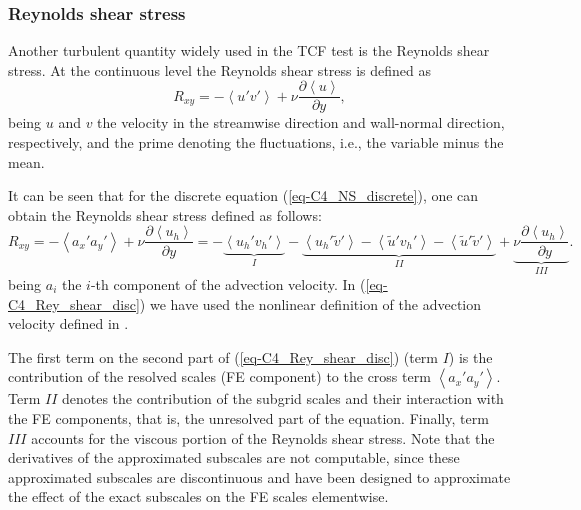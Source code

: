 \subsubsection{Reynolds shear stress}

Another turbulent quantity widely used in the TCF test is the Reynolds shear stress. At the continuous level the Reynolds shear stress is defined as
\begin{equation}
\label{eq-C4_Rey_shear_cont}
R_{xy}=-\left\langle u'v'\right\rangle+\nu\frac{\partial\left\langle u\right\rangle}{\partial y},
\end{equation}
being $u$ and $v$ the velocity in the streamwise direction and wall-normal direction, respectively,
and the prime denoting the fluctuations, i.e., the variable minus the mean.

It can be seen that for the discrete equation (\ref{eq-C4_NS_discrete}), one can obtain the Reynolds shear stress defined as follows:
\begin{equation}
\label{eq-C4_Rey_shear_disc}
R_{xy}=-\left\langle a_x'a_y'\right\rangle+\nu\frac{\partial\left\langle u_h\right\rangle}{\partial y}=-\underbrace{\left\langle u_h'v_h'\right\rangle}_I-\underbrace{\left\langle u_h'\tilde{v}'\right\rangle-\left\langle \tilde{u}'v_h'\right\rangle-\left\langle \tilde{u}'\tilde{v}'\right\rangle}_{II}+\underbrace{\nu\frac{\partial\left\langle u_h\right\rangle}{\partial y}}_{III}.
\end{equation}
being $a_i$ the $i$-th component of the advection velocity. In (\ref{eq-C4_Rey_shear_disc}) we have used the nonlinear definition of the advection velocity defined in .

The first term on the second part of  (\ref{eq-C4_Rey_shear_disc}) (term $I$) is the contribution of the resolved scales (FE component) to the cross term $\left\langle a_x'a_y'\right\rangle$. Term $II$ denotes the contribution of the subgrid scales and their interaction with the FE components, that is, the unresolved part of the equation. Finally, term $III$ accounts for the viscous portion of the Reynolds shear stress. Note that the derivatives of the approximated subscales are not computable, since these approximated subscales are discontinuous and have been designed to approximate the effect of the exact subscales on the FE scales elementwise. 

